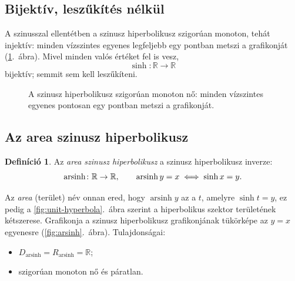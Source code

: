 \documentclass[11pt]{scrartcl}
\DeclareMathOperator{\arsinh}{arsinh}
\theoremstyle{definition}
\newtheorem{definition}{Definíció}
\theoremstyle{remark}
\begin{document}
\subsection{Bijektív, leszűkítés nélkül}

A szinusszal ellentétben a szinusz hiperbolikusz szigorúan monoton, tehát
injektív: minden vízszintes egyenes legfeljebb egy pontban metszi a
grafikonját (\ref{fig:sinh}.~ábra). Mivel minden valós értéket fel is vesz,
\[
	\sinh\colon \mathbb{R} \to \mathbb{R}
\]
bijektív; semmit sem kell leszűkíteni.

\begin{figure}[ht]
	\centering
	\caption{A szinusz hiperbolikusz szigorúan monoton nő: minden vízszintes
		egyenes pontosan egy pontban metszi a grafikonját.}
	\label{fig:sinh}
\end{figure}

\subsection{Az area szinusz hiperbolikusz}

\begin{definition}
	Az \emph{area szinusz hiperbolikusz} a szinusz hiperbolikusz inverze:
	\[
		\arsinh\colon \mathbb{R} \to \mathbb{R},
		\qquad
		\arsinh y = x \iff \sinh x = y\text.
	\]
\end{definition}

Az \emph{area} (terület) név onnan ered, hogy $\arsinh y$ az a $t$, amelyre
$\sinh t = y$, ez pedig a \ref{fig:unit-hyperbola}.~ábra szerint a hiperbolikus
szektor területének kétszerese. Grafikonja a szinusz hiperbolikusz grafikonjának
tükörképe az $y = x$ egyenesre (\ref{fig:arsinh}.~ábra). Tulajdonságai:
\begin{itemize}
	\item $D_{\arsinh} = R_{\arsinh} = \mathbb{R}$;
	\item szigorúan monoton nő és páratlan.
\end{itemize}
\end{document}
